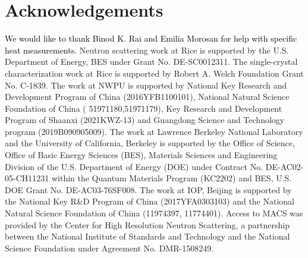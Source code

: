 \documentclass[aps,prl,onecolumn,amsmath,amssymb,superscriptaddress]{revtex4}
\newcommand{\ys}{\textcolor{black}}
\begin{document}
\section{Acknowledgements}
\ys{We would like to thank Binod K. Rai and Emilia Morosan for help with specific heat measurements.}
Neutron scattering work at Rice is supported by the U.S. Department of Energy, BES under Grant No. DE-SC0012311. The single-crystal characterization work at Rice is supported by Robert A. Welch Foundation Grant No. C-1839. The work at NWPU is supported by National Key Research and Development Program of China (2016YFB1100101), National Natural Science Foundation of China ( 51971180,51971179), Key Research and Development Program of Shaanxi (2021KWZ-13) and Guangdong Science and Technology program (2019B090905009). The work at Lawrence Berkeley National Laboratory and the University of California, Berkeley is supported by the Office of Science, Office of Basic Energy Sciences (BES), Materials Sciences and Engineering Division of the U.S. Department of Energy (DOE) under Contract No. DE-AC02-05-CH11231 within the Quantum Materials Program (KC2202) and BES, U.S. DOE Grant No. DE-AC03-76SF008. The work at IOP, Beijing is supported by the National Key R\&D Program of China (2017YFA0303103) and the National Natural Science Foundation of China (11974397, 11774401). Access to MACS was provided by the Center for High Resolution Neutron Scattering, a partnership between the National Institute of Standards and Technology and the National Science Foundation under Agreement No. DMR-1508249.
\end{document}
